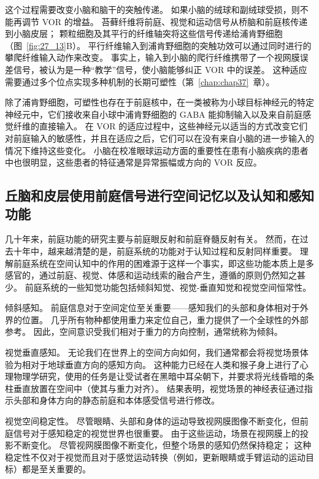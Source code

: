 这个过程需要改变小脑和脑干的突触传递。
如果小脑的绒球和副绒球受损，则不能再调节 VOR 的增益。
苔藓纤维将前庭、视觉和运动信号从桥脑和前庭核传递到小脑皮层；
颗粒细胞及其平行的纤维轴突将这些信号传递给浦肯野细胞（图~\ref{fig:27_13}B）。
平行纤维输入到浦肯野细胞的突触功效可以通过同时进行的攀爬纤维输入动作来改变。
事实上，输入到小脑的爬行纤维携带了一个视网膜误差信号，被认为是一种“教学”信号，使小脑能够纠正 VOR 中的误差。
这种适应需要通过多个位点实现多种机制的长期可塑性（第~\ref{chap:chap37}~章）。


除了浦肯野细胞，可塑性也存在于前庭核中，在一类被称为小球目标神经元的特定神经元中，它们接收来自小球中浦肯野细胞的 GABA 能抑制输入以及来自前庭感觉纤维的直接输入。
在 VOR 的适应过程中，这些神经元以适当的方式改变它们对前庭输入的敏感性，并且在适应之后，它们可以在没有来自小脑的进一步输入的情况下维持这些变化。
小脑在校准眼球运动方面的重要性在患有小脑疾病的患者中也很明显，这些患者的特征通常是异常振幅或方向的 VOR 反应。



\subsection{丘脑和皮层使用前庭信号进行空间记忆以及认知和感知功能}

几十年来，前庭功能的研究主要与前庭眼反射和前庭脊髓反射有关。
然而，在过去十年中，越来越清楚的是，前庭系统的功能对于认知过程和反射同样重要。
理解前庭系统在空间认知中的作用的困难源于这样一个事实，即这些功能本质上是多感官的，通过前庭、视觉、体感和运动线索的融合产生，遵循的原则仍然知之甚少。
前庭系统的一些知觉功能包括倾斜知觉、视觉-垂直知觉和视觉空间恒常性。


倾斜感知。 前庭信息对于空间定位至关重要——感知我们的头部和身体相对于外界的位置。
几乎所有物种都使用重力来定位自己，重力提供了一个全球性的外部参考。
因此，空间意识受我们相对于重力的方向控制，通常统称为倾斜。


视觉垂直感知。
无论我们在世界上的空间方向如何，我们通常都会将视觉场景体验为相对于地球垂直方向的感知方向。
这种能力已经在人类和猴子身上进行了心理物理学研究，使用的任务是让受试者在黑暗中耳朵朝下，并要求将光线昏暗的条柱垂直放置在空间中（使其与重力对齐）。
结果表明，视觉场景的神经表征通过指示头部和身体方向的静态前庭和本体感受信号进行修改。


视觉空间稳定性。
尽管眼睛、头部和身体的运动导致视网膜图像不断变化，但前庭信号对于感知稳定的视觉世界也很重要。
由于这些运动，场景在视网膜上的投影不断变化。
尽管视网膜图像不断变化，但整个场景的感知仍然保持稳定；
这种稳定性不仅对于视觉而且对于感觉运动转换（例如，更新眼睛或手臂运动的运动目标）都是至关重要的。



